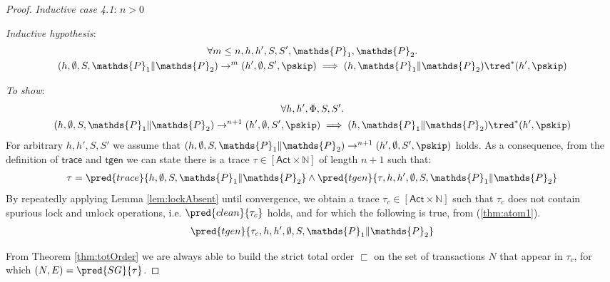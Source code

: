 \begin{thm}
{\begin{proof}
\textit{Inductive case 4.1}: $n > 0$

\textit{Inductive hypothesis}:
\begin{gather*}
	\forall m \leq n, h, h', S, S', \mathds{P}_1, \mathds{P}_2 \ldotp \\
	(h, \emptyset, S, \mathds{P}_1 \| \mathds{P}_2) \rightarrow^m (h', \emptyset, S', \pskip)
	\implies
	(h, \mathds{P}_1 \| \mathds{P}_2) \tred^* (h', \pskip)
\end{gather*}

\textit{To show}:
\begin{gather*}
	\forall h, h', \Phi, S, S' \ldotp \\
	(h, \emptyset, S, \mathds{P}_1 \| \mathds{P}_2) \rightarrow^{n+1} (h', \emptyset, S', \pskip)
	\implies
	(h, \mathds{P}_1 \| \mathds{P}_2) \tred^* (h', \pskip)
\end{gather*}
For arbitrary $h, h', S, S'$ we assume that $(h, \emptyset, S, \mathds{P}_1 \| \mathds{P}_2) \rightarrow^{n+1} (h', \emptyset, S', \pskip)$ holds. As a consequence, from the definition of $\mathsf{trace}$ and $\mathsf{tgen}$ we can state there is a trace $\tau \in [\mathsf{Act} \times \mathds{N}]$ of length $n + 1$ such that:
\begin{gather}
	\label{thm:atom1}
	\tau = \pred{trace}{h, \emptyset, S, \mathds{P}_1 \| \mathds{P}_2} \land \pred{tgen}{\tau, h, h', \emptyset, S, \mathds{P}_1 \| \mathds{P}_2}
\end{gather}
By repeatedly applying Lemma \ref{lem:lockAbsent} until convergence, we obtain a trace $\tau_c \in [\mathsf{Act} \times \mathds{N}]$ such that $\tau_c$ does not contain spurious lock and unlock operations, i.e. $\pred{clean}{\tau_c}$ holds, and for which the following is true, from (\ref{thm:atom1}).
\begin{gather}
	\label{thm:atom2} \pred{tgen}{\tau_c, h, h', \emptyset, S, \mathds{P}_1 \| \mathds{P}_2}
\end{gather}

From Theorem \ref{thm:totOrder} we are always able to build the strict total order $\sqsubset$ on the set of transactions $N$ that appear in $\tau_c$, for which $(N, E) = \pred{SG}{\tau}$.


\end{proof}}
\end{thm}
